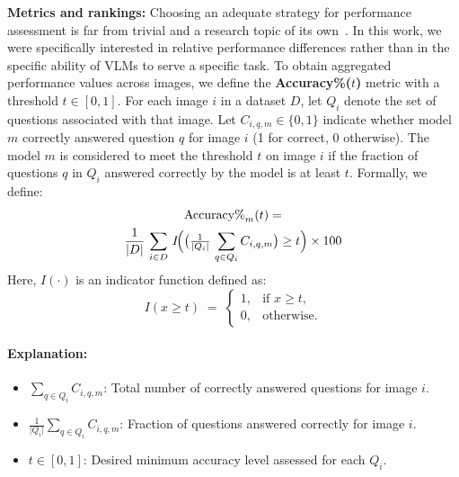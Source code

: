 \textbf{Metrics and rankings:} Choosing an adequate strategy for performance assessment is far from trivial and a research topic of its own~\cite{maier2024metrics,reinke2024understanding}. In this work, we were specifically interested in relative performance differences rather than in the specific ability of VLMs to serve a specific task. To obtain aggregated performance values across images, we define the \textbf{Accuracy\%($t$)} metric with a threshold \(t \in [0, 1]\).  
For each image \(i\) in a dataset \(D\), let \(Q_i\) denote the set of questions associated with that image.  
Let \(C_{i,q,m} \in \{0, 1\}\) indicate whether model \(m\) correctly answered question \(q\) for image \(i\) (1 for correct, 0 otherwise). The model \(m\) is considered to meet the threshold \(t\) on image \(i\) if the fraction of questions \(q\) in \(Q_i\) answered correctly by the model is at least \(t\). Formally, we define:
\begin{gather*}
\text{Accuracy\%}_m(t) = \\
\frac{1}{\lvert D\rvert}\,\sum_{i \in D}\,
    I\!\Bigl(\bigl(\tfrac{1}{\lvert Q_i\rvert}\,\sum_{q \in Q_i}C_{i,q,m}\bigr) \ge t\Bigr)
    \times 100
\end{gather*}
Here, \(I(\cdot)\) is an indicator function defined as:
\[
I(x \ge t)
 \;=\;
 \begin{cases}
  1, & \text{if } x \ge t,\\
  0, & \text{otherwise}.
 \end{cases}
\]
\paragraph{Explanation:}
\begin{itemize}
  \item \(\sum_{q \in Q_i} C_{i,q,m}\): Total number of correctly answered questions for image \(i\).
  \item \(\frac{1}{\lvert Q_i\rvert}\sum_{q \in Q_i} C_{i,q,m}\): Fraction of questions answered correctly for image \(i\).
  \item \(t \in [0,1]\): Desired minimum accuracy level assessed for each \(Q_i\).
\end{itemize}





